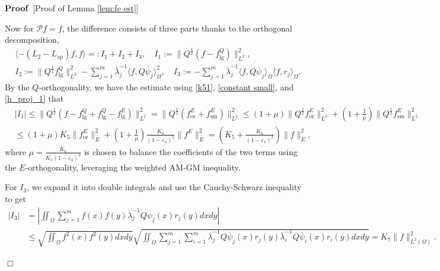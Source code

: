 \documentclass[11pt,a4paper]{article}
\numberwithin{equation}{section}
\newcommand{\assign}{:=}
\newcommand{\backassign}{=:}
\newcommand{\tmop}[1]{\ensuremath{\operatorname{#1}}}
\newenvironment{proof}{\noindent\textbf{Proof\ }}{\hspace*{\fill}$\Box$\medskip}
\begin{document}
\begin{proof}[Proof of Lemma \ref{lem:fe est}]
  
   Now
for $\mathcal{P}f=f$, the difference  consists of three parts thanks to the orthogonal decomposition,
  $$\begin{aligned}
    &\langle -(L_2 - L_{\tmop{ap}}) f, f \rangle 
    \backassign  I_1 + I_2+I_3,\quad
    I_1  \assign  \|Q^{\frac{1}{2}}(f-f^Q_{\tmop{lg}})\|_{L^2}^2,\\
    &I_2  \assign  \|Q^{\frac{1}{2}}f^Q_{\tmop{lg}}\|_{L^2}^2- \sum_{j = 1}^m \overline\lambda_j^{-1}\langle f, Q\overline\psi_j \rangle_{
  \Omega}^2,\quad
    I_3\assign- \sum_{j = 1}^m\overline{\lambda}_j^{-1} \langle f, Q \overline\psi_j
    \rangle_{\Omega} \langle f, r_j \rangle_{\Omega} .
  \end{aligned}$$
  By the $Q$-orthogonality, we have the estimate using \eqref{k51}, \eqref{constant small}, and  \eqref{h_proj_1} that\begin{equation}\begin{aligned}
  \label{fn eq1}&|I_1|\leqslant\| Q^{\frac{1}{2}} (f-f^Q_{\tmop{lg}}+f^Q_{\tmop{lg}}-f^{E}_{\tmop{lg}})
    \|^2_{L^2}=\| Q^{\frac{1}{2}} (f^E_{\tmop{or}}+f^{E}_{\tmop{sm}})
    \|_{L^2}^2\leqslant (1 + \mu) \|Q^{\frac{1}{2}}f^E_{\tmop{or}}\|_{L^2}^2 + ( 1 + \frac{1}{\mu} ) \|Q^{\frac{1}{2}}f^E_{\tmop{sm}}\|_{L^2}^2\\&\leqslant(1 + \mu)K_5\|f^E_{\tmop{or}}\|_E^2+ ( 1 + \frac{1}{\mu} ) \frac{K_6}{(1-\varepsilon_4)^2}\| f^E\|_{E}^2=(K_5+\frac{K_6}{(1-\varepsilon_4)^2})\| f\|_{E}^2,    
  \end{aligned}
  \end{equation}
   where $\mu=\frac{K_6}{K_5(1-\varepsilon_4)^2}$ is chosen to balance the coefficients of the two terms using the $E$-orthogonality, leveraging the weighted AM-GM inequality. %

  For $I_3$, we expand it into double integrals and use the Cauchy-Schwarz inequality to get 
  \begin{equation}
      \label{est i3}\begin{aligned}
          | I_3 |&=|\iint_{\Omega} \sum_{j=1}^m f(x)f(y)\overline{\lambda}_j^{-1}Q \overline\psi_j(x)r_j(y)dxdy|\\
     &\leqslant \sqrt{\iint_{\Omega} f^2(x)f^2(y)dxdy} \sqrt{\iint_{\Omega}\sum_{j = 1}^m \sum_{i = 1}^m\overline{\lambda}_j^{-1}Q \overline\psi_j(x)r_j(y)\overline{\lambda}_i^{-1}Q \overline\psi_i(x)r_i(y)dxdy}   = K_7 \| f \|_{{L^2}(\Omega)}^2.\end{aligned}
  \end{equation}
  

\end{proof}
\end{document}
